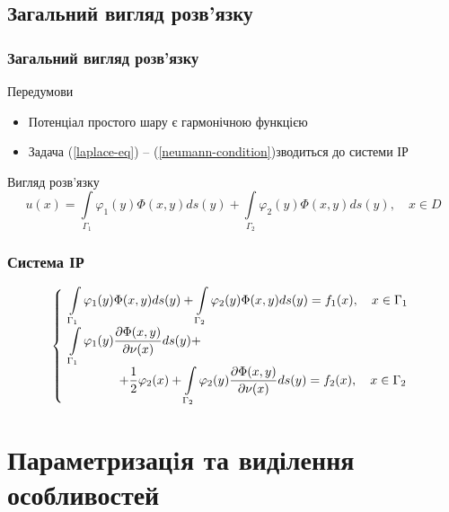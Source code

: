 \documentclass{beamer}
\numberwithin{equation}{section}
\newcommand{\intl}{\int\limits}
\newcommand{\boundprob}{(\ref{laplace-eq}) -- (\ref{neumann-condition})}
\begin{document}

	\subsection{Загальний вигляд розв'язку}
	\begin{frame}
		\frametitle{Загальний вигляд розв'язку}
		
		\begin{block}{Передумови}
			\begin{itemize}
				\item Потенціал простого шару є гармонічною функцією
				\item Задача \boundprob зводиться до системи ІР
			\end{itemize}
		\end{block}
		\vspace{0.8cm}
		\begin{block}{Вигляд розв'язку}
			$$
			u(x) 
			= \intl_{\Gamma_1} \varphi_1(y) \Phi(x, y) d s(y)
			+ \intl_{\Gamma_2} \varphi_2(y) \Phi(x, y) d s(y)
			, \quad x \in D
			$$
		\end{block}
	\end{frame}

	\begin{frame}
		\frametitle{Система ІР}
		
		\begin{block}{}
			$$
			\left\{
			\begin{array}{l}
				\displaystyle
				\intl_{\Gamma_{1}} \varphi_1(y) \Phi(x, y) d s(y)
				+ \intl_{\Gamma_{2}} \varphi_2(y) \Phi(x, y) d s(y)
				= f_{1}(x), \quad x \in \Gamma_{1} 
				\\ [0.5cm]
				\displaystyle
				\intl_{\Gamma_{1}} \varphi_1(y) \frac{\partial \Phi(x, y)}{\partial \nu(x)} d s(y) \space +
				\\
				\displaystyle
				\qquad\qquad + \space \frac{1}{2}\varphi_2(x)
				+ \intl_{\Gamma_{2}} \varphi_2(y) \frac{\partial \Phi(x, y)}{\partial \nu(x)} d s(y)
				= f_{2}(x), \quad x \in \Gamma_{2}
			\end{array}\right.
			$$
		\end{block}
	\end{frame}

	\section{Параметризацiя та виділення особливостей} 
	
\end{document}
